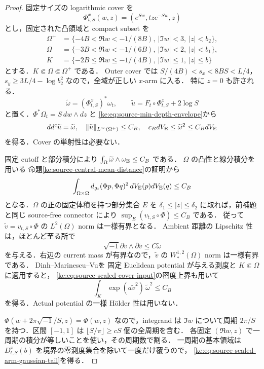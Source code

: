 \begin{proof}
固定サイズの logarithmic cover を
\[
 \Phi^x_{t,S}(w,z)=(e^{Sw},tze^{-Sw},z)
\]
とし，固定された凸領域と compact subset を
\[
 \begin{split}
 \Omega^+&=\{-4B<\Re w<-1/(8B),\ |\Im w|<3,\ |z|<b_2\},\\
 \Omega&=\{-3B<\Re w<-1/(6B),\ |\Im w|<2,\ |z|<b_1\},\\
 K&=\{-2B\le\Re w\le-1/(4B),\ |\Im w|\le1,\ |z|\le b\}
 \end{split}
\]
とする．$K\Subset\Omega\Subset\Omega^+$ である．
Outer cover では $S/(4B)<s_x<8BS<L/4$，
$s_y\ge3L/4-\log b_2^2$ なので，全域が正しい $x$-arm に入る．
特に $z=0$ も許される．
\[
 \widetilde\omega=(\Phi^x_{t,S})^*\omega_t,
 \qquad \widetilde u=F_t\circ\Phi^x_{t,S}+2\log S
\]
と置く．$\Phi^*\Omega_t=S\,dw\wedge dz$ と
\eqref{ke:eq:source-min-depth-envelope}から
\begin{equation}\label{ke:eq:source-scaled-cover-input}
 dd^c\widetilde u=\widetilde\omega,
 \quad \|\widetilde u\|_{L^\infty(\Omega^+)}\le C_B,
 \quad c_BdV_{\rm E}\le\widetilde\omega^2\le C_BdV_{\rm E}
\end{equation}
を得る．Cover の単射性は必要ない．

固定 cutoff と部分積分により
$\int_\Omega\widetilde\omega\wedge\omega_{\rm E}\le C_B$ である．
$\Omega$ の凸性と線分積分を用いる
命題\ref{ke:source-central-mean-distance}の証明から
\[
 \int_{\Omega\times\Omega}
 d_{g_t}(\Phi p,\Phi q)^2\,dV_{\rm E}(p)dV_{\rm E}(q)\le C_B
\]
となる．$\Omega$ の正の固定体積を持つ部分集合 $E$ を
$\delta_1\le|z|\le\delta_2$ に取れば，前補題と同じ source-free connector により
$\sup_E(v_{t,S}\circ\Phi)\le C_B$ である．
従って $\widetilde v=v_{t,S}\circ\Phi$ の $L^2(\Omega)$ norm は一様有界となる．
Ambient 距離の Lipschitz 性は，ほとんど至る所で
\[
 \sqrt{-1}\partial\widetilde v\wedge\bar\partial\widetilde v
 \le C\widetilde\omega
\]
を与える．右辺の current mass が有界なので，$\widetilde v$ の
$W_*^{1,2}(\Omega)$ norm は一様有界である．
Dinh--Marinescu--Vu\cite[Theorem~1.2]{DMVMT}を
固定 Euclidean potential が与える測度と $K\Subset\Omega$ に適用すると，
\eqref{ke:eq:source-scaled-cover-input}の密度上界も用いて
\[
 \int_K\exp(a\widetilde v^2)\,\widetilde\omega^2\le C_B
\]
を得る．Actual potential の一様 H\"older 性は用いない．

$\Phi(w+2\pi\sqrt{-1}/S,z)=\Phi(w,z)$ なので，integrand は
$\Im w$ について周期 $2\pi/S$ を持つ．区間 $[-1,1]$ は
$\lfloor S/\pi\rfloor\ge cS$ 個の全周期を含む．
各固定 $(\Re w,z)$ で一周期の積分が等しいことを使い，その周期数で割る．
一周期の基本領域は $D^x_{t,S}(b)$ を境界の零測度集合を除いて一度だけ覆うので，
\eqref{ke:eq:source-scaled-arm-gaussian-tail}を得る．
\end{proof}

